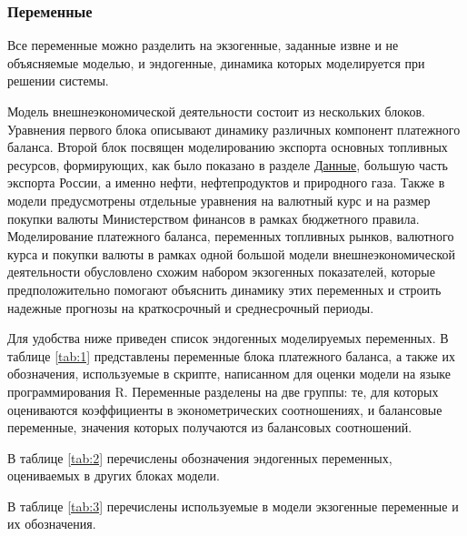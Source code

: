 \documentclass[a4paper, 14pt]{extarticle}
\begin{document}
\subsubsection{Переменные}

Все переменные можно разделить на экзогенные, заданные извне и не объясняемые моделью, и эндогенные, динамика которых моделируется при решении системы.

Модель внешнеэкономической деятельности состоит из нескольких блоков.
Уравнения первого блока описывают динамику различных компонент платежного баланса. 
Второй блок посвящен моделированию экспорта основных топливных ресурсов, формирующих, как было показано в разделе \hyperref[sub:data]{Данные}, большую часть экспорта России, а именно нефти, нефтепродуктов и природного газа.
Также в модели предусмотрены отдельные уравнения на валютный курс и на размер покупки валюты Министерством финансов в рамках бюджетного правила.
Моделирование платежного баланса, переменных топливных рынков, валютного курса и покупки валюты в рамках одной большой модели внешнеэкономической деятельности обусловлено схожим набором экзогенных показателей, которые предположительно помогают объяснить динамику этих переменных и строить надежные прогнозы на краткосрочный и среднесрочный периоды.

Для удобства ниже приведен список эндогенных моделируемых переменных. 
В таблице \ref{tab:1} представлены переменные блока платежного баланса, а также их обозначения, используемые в скрипте, написанном для оценки модели на языке программирования R.
Переменные разделены на две группы: те, для которых оцениваются коэффициенты в эконометрических соотношениях, и балансовые переменные, значения которых получаются из балансовых соотношений.

В таблице \ref{tab:2} перечислены обозначения эндогенных переменных, оцениваемых в других блоках модели.

В таблице \ref{tab:3} перечислены используемые в модели экзогенные переменные и их обозначения.
\end{document}
